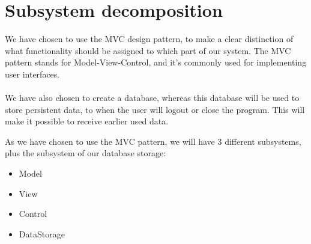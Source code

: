 \section{Subsystem decomposition}

We have chosen to use the MVC design pattern, to make a clear distinction of what functionality 
should be assigned to which part of our system. The MVC pattern stands for Model-View-Control, 
and it’s commonly used for implementing user interfaces.
\\\\
We have also chosen to create a database, whereas this database will be used to store persistent data, to when the user will logout or close the program. This will make it possible to receive earlier used data.

As we have chosen to use the MVC pattern, we will have 3 different subsystems, plus the subsystem of our database storage:

\begin{itemize}
	\item Model
	\item View
	\item Control
	\item DataStorage
\end{itemize}

